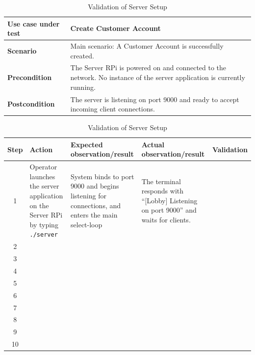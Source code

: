 \documentclass{article}
\begin{document}
\begin{table}[h]
\centering
\begin{tabular}{|p{3cm}|p{10cm}|}
\hline
\textbf{Use case under test} & \textbf{Create Customer Account} \\
\hline
\textbf{Scenario} & Main scenario: A Customer Account is successfully created. \\
\hline
\textbf{Precondition} & The Server RPi is powered on and connected to the network. No instance of the server application is currently running. \\
\hline
\textbf{Postcondition} & The server is listening on port 9000 and ready to accept incoming client connections. \\
\hline
\end{tabular}

\vspace{0.5cm}

\begin{tabular}{|c|p{2.5cm}|p{3.2cm}|p{3.2cm}|p{2.2cm}|}
\hline
\textbf{Step} & \textbf{Action} & \textbf{Expected observation/result} & \textbf{Actual observation/result} & \textbf{Validation} \\
\hline
1 & Operator launches the server application on the Server RPi by typing \texttt{./server} & System binds to port 9000 and begins listening for connections, and enters the main select-loop & The terminal responds with ``[Lobby] Listening on port 9000'' and waits for clients. & \cellcolor{green!20} \\
\hline
2 & & & & \\
\hline
3 & & & & \\
\hline
4 & & & & \\
\hline
5 & & & & \\
\hline
6 & & & & \\
\hline
7 & & & & \\
\hline
8 & & & & \\
\hline
9 & & & & \\
\hline
10 & & & & \\
\hline
\end{tabular}
\caption{Validation of Server Setup}
\end{table}
\end{document}
